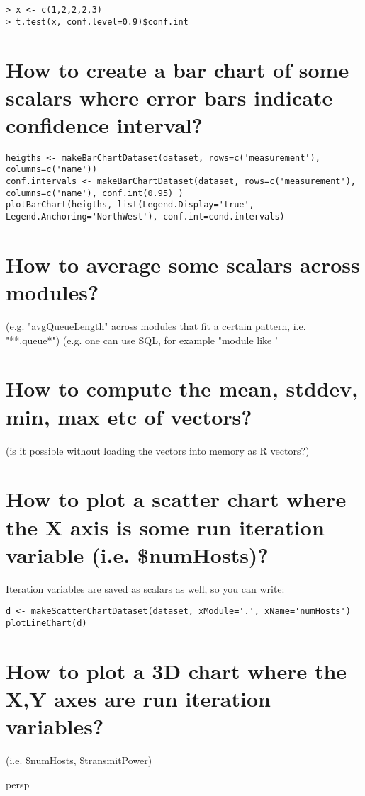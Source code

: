\begin{verbatim}
> x <- c(1,2,2,2,3)
> t.test(x, conf.level=0.9)$conf.int
\end{verbatim}

\section{How to create a bar chart of some scalars where error bars indicate
confidence interval?}

\begin{verbatim}
heigths <- makeBarChartDataset(dataset, rows=c('measurement'), columns=c('name'))
conf.intervals <- makeBarChartDataset(dataset, rows=c('measurement'), columns=c('name'), conf.int(0.95) )
plotBarChart(heigths, list(Legend.Display='true', Legend.Anchoring='NorthWest'), conf.int=cond.intervals)
\end{verbatim}

\section{How to average some scalars across modules?}

 (e.g. "avgQueueLength"
across modules that fit a certain pattern, i.e. "**.queue*")
(e.g. one can use SQL, for example "module like '%

\section{How to compute the mean, stddev, min, max etc of vectors?}

(is it possible without loading the vectors into memory as R vectors?)

\section{How to plot a scatter chart where the X axis is some run iteration
variable (i.e. \$numHosts)?}

Iteration variables are saved as scalars as well, so you can write:

\begin{verbatim}
d <- makeScatterChartDataset(dataset, xModule='.', xName='numHosts')
plotLineChart(d)
\end{verbatim}

\section{How to plot a 3D chart where the X,Y axes are run iteration variables?}

(i.e. \$numHosts, \$transmitPower)

persp